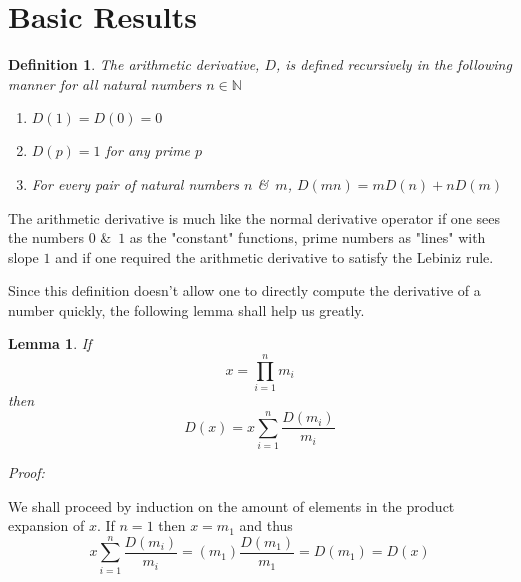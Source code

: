 \documentclass[paper=a4,fontsize=paper,12.5pt]{book}
\newcommand{\3}{\vspace*{3mm}}
\newcommand{\Proof}{\textit{Proof:}}
\newcommand{\N}{\mathbb{N}}
\begin{document}
\newtheorem{lemma}{Lemma}
\newtheorem{sublemma}{Lemma}[lemma]
\newtheorem{theorem}{Theorem}
\newtheorem{conjecture}{Conjecture}

\newtheorem{definition}{Definition}[section]
\newtheorem{problem}{Problem}
\newtheorem{corollary}{Corollary}

\section*{Basic Results} 


\begin{definition}

The arithmetic derivative, $D$, is defined recursively in the following manner for all natural numbers $n \in \N$

\3

\begin{enumerate}

\item $D(1) = D(0) = 0$

\item $D(p) = 1$ for any prime $p$

\item For every pair of natural numbers $n$ \&\ $m$, $D(mn) = mD(n) + nD(m)$ 

\end{enumerate}

\end{definition}

\3

The arithmetic derivative is much like the normal derivative operator if one sees the numbers $0$ \&\ $1$ as the "constant" functions, prime numbers as "lines" with slope $1$ and if one required the arithmetic derivative to satisfy the Lebiniz rule. 

\3

Since this definition doesn't allow one to directly compute the derivative of a number quickly, the following lemma shall help us greatly.

\begin{lemma}

If \[x = \prod_{i =1 }^n m_i\] then \[D(x) = x\sum_{i = 1}^n \frac{D(m_i)}{m_i}\]


\end{lemma}

\Proof

\3

We shall proceed by induction on the amount of elements in the product expansion of $x$. If $n = 1$ then $x = m_1$ and thus  \[x\sum_{i = 1}^n \frac{D(m_i)}{m_i} = (m_1)\frac{D(m_1)}{m_1} = D(m_1) = D(x)\]
\end{document}
